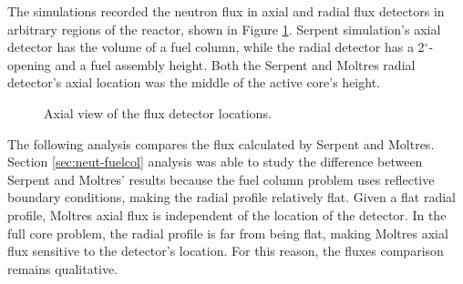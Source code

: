 The simulations recorded the neutron flux in axial and radial flux detectors in arbitrary regions of the reactor, shown in Figure \ref{fig:fullcore-detectors}.
Serpent simulation's axial detector has the volume of a fuel column, while the radial detector has a 2$^{\circ}$-opening and a fuel assembly height.
Both the Serpent and Moltres radial detector's axial location was the middle of the active core's height.

\begin{figure}[htbp!]
	\centering
	\hfill
	\caption{Axial view of the flux detector locations.}
	\label{fig:fullcore-detectors}
\end{figure}

The following analysis compares the flux calculated by Serpent and Moltres.
Section \ref{sec:neut-fuelcol} analysis was able to study the difference between Serpent and Moltres' results because the fuel column problem uses reflective boundary conditions, making the radial profile relatively flat.
Given a flat radial profile, Moltres axial flux is independent of the location of the detector.
In the full core problem, the radial profile is far from being flat, making Moltres axial flux sensitive to the detector's location.
For this reason, the fluxes comparison remains qualitative.


